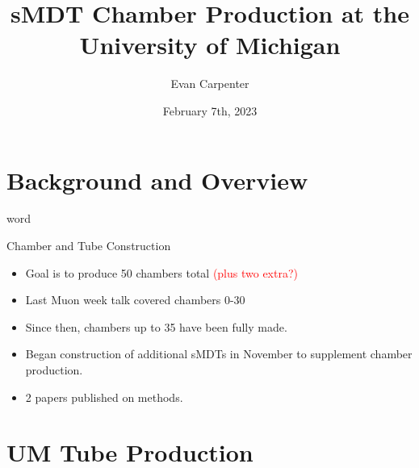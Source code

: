 \documentclass{beamer}
\title{sMDT Chamber Production at the University of Michigan}
\author{Evan Carpenter}
\date{February 7th, 2023}
\begin{document}
\begin{frame}
	\titlepage
\end{frame}
\begin{frame}
	\tableofcontents
\end{frame}
\section*{Background and Overview}
	\begin{frame}
		word
	\end{frame}

	\begin{frame}{Chamber and Tube Construction}
		\begin{itemize}
			\item Goal is to produce 50 chambers total \textcolor{red}{(plus two extra?)}
			\item Last Muon week talk covered chambers 0-30
			\item Since then, chambers up to 35 have been fully made.
			\item Began construction of additional sMDTs in November to supplement chamber production.
			\item 2 papers published on methods. 
		\end{itemize}
	\end{frame}
	\section{UM Tube Production}
\end{document}
